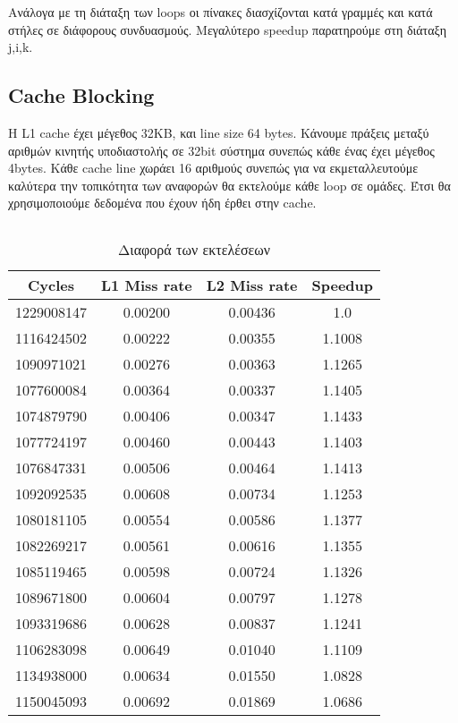 \documentclass[a4paper,12pt]{article}
\begin{document}
Ανάλογα με τη διάταξη των loops οι πίνακες διασχίζονται κατά γραμμές και κατά
στήλες σε διάφορους συνδυασμούς. Μεγαλύτερο speedup παρατηρούμε στη διάταξη
j,i,k.


\pagebreak


\subsection{Cache Blocking}

Η L1 cache έχει μέγεθος 32KB, και line size 64 bytes. Κάνουμε πράξεις μεταξύ
αριθμών κινητής υποδιαστολής σε 32bit σύστημα συνεπώς κάθε ένας έχει μέγεθος
4bytes. Κάθε cache line χωράει 16 αριθμούς συνεπώς για να εκμεταλλευτούμε
καλύτερα την τοπικότητα των αναφορών θα εκτελούμε κάθε loop σε ομάδες. Έτσι θα 
χρησιμοποιούμε δεδομένα που έχουν ήδη έρθει στην cache.

\inputminted[linenos,fontsize=\scriptsize,frame=leftline]{c}{files/partA2_scan-v3-partA.c}


\begin{table}[H]
    \centering
    \begin{tabular}{| c | c | c | c |}
        \hline
        Cycles & L1 Miss rate & L2 Miss rate & Speedup  \\
        \hline
        \hline
        1229008147 & 0.00200 & 0.00436 & 1.0 \\
        1116424502 & 0.00222 & 0.00355 & 1.1008 \\
        1090971021 & 0.00276 & 0.00363 & 1.1265 \\
        1077600084 & 0.00364 & 0.00337 & 1.1405 \\
        1074879790 & 0.00406 & 0.00347 & 1.1433 \\
        1077724197 & 0.00460 & 0.00443 & 1.1403 \\
        1076847331 & 0.00506 & 0.00464 & 1.1413 \\
        1092092535 & 0.00608 & 0.00734 & 1.1253 \\
        1080181105 & 0.00554 & 0.00586 & 1.1377 \\
        1082269217 & 0.00561 & 0.00616 & 1.1355\\
        1085119465 & 0.00598 & 0.00724 & 1.1326 \\
        1089671800 & 0.00604 & 0.00797 & 1.1278 \\
        1093319686 & 0.00628 & 0.00837 & 1.1241 \\
        1106283098 & 0.00649 & 0.01040 & 1.1109 \\
        1134938000 & 0.00634 & 0.01550 & 1.0828 \\
        1150045093 & 0.00692 & 0.01869 & 1.0686 \\
        \hline
    \end{tabular}
    \caption{Διαφορά των εκτελέσεων}
    \label{fig:T4}
\end{table}
\end{document}
